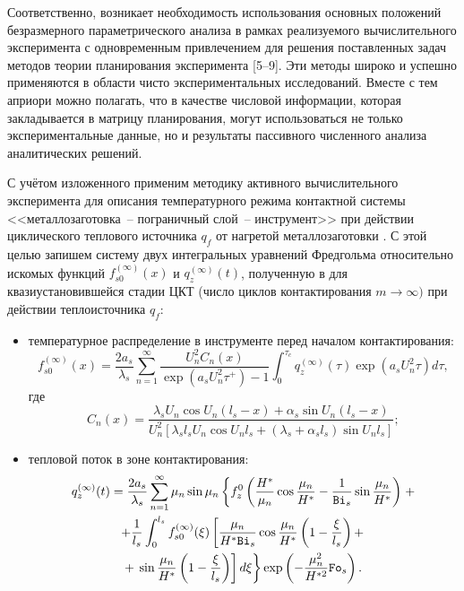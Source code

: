 Соответственно, возникает необходимость использования основных положений
безразмерного параметрического анализа \cite{stulin:bib4} в рамках
реализуемого вычислительного эксперимента с одновременным
привлечением для решения поставленных задач методов теории
планирования эксперимента [5--9]. Эти методы широко и успешно применяются в области чисто
экспериментальных исследований. Вместе с тем априори можно
полагать, что в качестве числовой информации, которая
закладывается в матрицу планирования, могут использоваться не
только экспериментальные данные, но и результаты пассивного
численного анализа аналитических решений.

С учётом изложенного применим методику активного вычислительного
эксперимента для описания температурного режима контактной системы
<<металлозаготовка~-- пограничный слой~-- инструмент>> при
действии циклического теплового источника $q_f$ от нагретой
металлозаготовки \cite{stulin:bib1}. С этой целью запишем систему
двух интегральных уравнений Фредгольма относительно искомых
функций $f_{s0}^{(\infty )} (x)$ и $q_z^{(\infty )} (t)$,
полученную в \cite{stulin:bib1} для квазиустановившейся стадии ЦКТ
(число циклов контактирования $m\to \infty )$ при действии
теплоисточника $q_f$:
\begin{itemize}


\item температурное распределение в инструменте перед началом
контактирования:
\begin{equation}
\label{stulin:eq1}
f_{s0}^{(\infty )} (x) =\frac{2a_s }{\lambda _s
}\sum\limits_{n=1}^\infty \frac{U_n^2 C_n (x)}{\exp \left(a_s
U_n^2 \tau ^+ \right)-1} \int_0^{\tau _c } q_z^{(\infty )}
(\tau) \exp \left(a_s U_n^2 \tau \right)d\tau,
\end{equation}
где
$$
C_n (x)  =\frac{\lambda _s U_n \cos U_n (l_s -x)+\alpha _s \sin
U_n (l_s -x)}{U_n^2 \left[ \lambda _s l_s U_n \cos U_n l_s +(
\lambda _s +\alpha _s l_s)\sin U_n l_s \right]};
$$


\item тепловой поток в зоне контактирования:
\begin{multline}
\label{stulin:eq2} q_z^{(\infty )} (t)=\frac{2a_s}{\lambda _s }\sum\limits_{n=1}^\infty \mu _n \sin \mu _n \left\{ f_z^0 \left(
\frac{H^\ast }{\mu _n }\cos \frac{\mu _n }{H^\ast }-\frac{1}{{\tt Bi}_s
}\sin \frac{\mu _n }{H^\ast }\right)\right. + \\ 
+ \frac{1}{l_s} \int _0^{l_s } f_{s0}^{(\infty )} (\xi)
 \left[ \frac{\mu _n}{H^\ast {\tt Bi}_s} \cos \frac{\mu _n}{H^\ast }\left( 1-\frac{\xi }{l_s } \right)+ \right. \\ + \left. \left.
 \sin \frac{\mu _n
}{H^\ast }\left(1-\frac{\xi }{l_s } \right) \right]d\xi \right\}
\exp \left(-\frac{\mu _n^2 }{H^{\ast 2}}{\tt Fo}_s  \right).
\end{multline}

\end{itemize}

